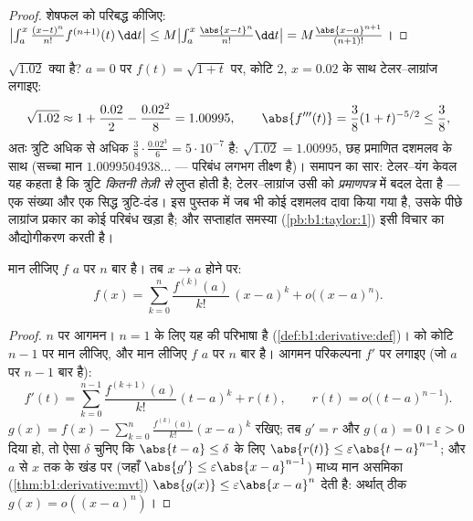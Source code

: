 \begin{proof}
 शेषफल को परिबद्ध कीजिए: $\bigl|\int_a^x \frac{(x-t)^n}{n!}
f^{(n+1)}(t)\,\dd t\bigr| \leq M \bigl|\int_a^x \frac{\abs{x-t}^n}{n!}\dd
t\bigr| = M\frac{\abs{x-a}^{n+1}}{(n+1)!}$।
\end{proof}

\begin{example}[प्रमाणित संख्याएँ]\label{ex:b1:taylor:certified}
$\sqrt{1.02}$ क्या है? $a = 0$ पर $f(t) = \sqrt{1 + t}$ पर, कोटि $2$, $x =
0.02$ के साथ टेलर--लाग्रांज लगाइए:
\[
\sqrt{1.02} \approx 1 + \frac{0.02}{2} - \frac{0.02^2}{8}
= 1.00995 ,
\qquad
\abs{f'''(t)} = \frac{3}{8}(1+t)^{-5/2} \leq \frac 38 ,
\]
अतः त्रुटि अधिक से अधिक $\frac38 \cdot \frac{0.02^3}{6} = 5\cdot10^{-7}$ है:
$\sqrt{1.02} = 1.00995$, छह प्रमाणित दशमलव के साथ (सच्चा मान
$1.0099504938\dots$ --- परिबंध लगभग तीक्ष्ण है)। समापन का सार: टेलर--यंग
केवल यह कहता है कि त्रुटि \emph{कितनी तेज़ी से} लुप्त होती है;
टेलर--लाग्रांज उसी  को \emph{प्रमाणपत्र} में बदल देता है --- एक संख्या
और एक सिद्ध त्रुटि-दंड। इस पुस्तक में जब भी कोई दशमलव दावा किया गया है, उसके
पीछे लाग्रांज प्रकार का कोई परिबंध खड़ा है; और सप्ताहांत समस्या
(\cref{pb:b1:taylor:1}) इसी विचार का औद्योगीकरण करती है।
\end{example}

\begin{theorem}[टेलर--यंग]\label{thm:b1:taylor:young}
मान लीजिए $f$ $a$ पर $n$ बार  है। तब $x \to a$ होने पर:
\[
f(x) = \sum_{k=0}^{n} \frac{f^{(k)}(a)}{k!}\,(x-a)^k
+ o\bigl((x-a)^n\bigr) .
\]
\end{theorem}

\begin{proof}
$n$ पर आगमन। $n = 1$ के लिए यह  की परिभाषा है
(\cref{def:b1:derivative:def})।  को कोटि $n - 1$ पर मान लीजिए, और मान
लीजिए $f$ $a$ पर $n$ बार  है। आगमन परिकल्पना $f'$ पर लगाइए (जो $a$ पर
$n-1$ बार  है):
\[
f'(t) = \sum_{k=0}^{n-1} \frac{f^{(k+1)}(a)}{k!}(t-a)^k + r(t),
\qquad r(t) = o\bigl((t-a)^{n-1}\bigr).
\]
$g(x) = f(x) - \sum_{k=0}^{n} \frac{f^{(k)}(a)}{k!}(x-a)^k$ रखिए; तब $g' =
r$ और $g(a) = 0$। $\varepsilon > 0$ दिया हो, तो ऐसा $\delta$ चुनिए कि
$\abs{t-a} \leq \delta$ के लिए $\abs{r(t)} \leq \varepsilon\abs{t -
a}^{n-1}$; और $a$ से $x$ तक के खंड पर (जहाँ $\abs{g'} \leq
\varepsilon\abs{x-a}^{n-1}$) माध्य मान असमिका (\cref{thm:b1:derivative:mvt})
$\abs{g(x)} \leq \varepsilon\abs{x - a}^n$ देती है: अर्थात् ठीक $g(x) =
o((x-a)^n)$।
\end{proof}

